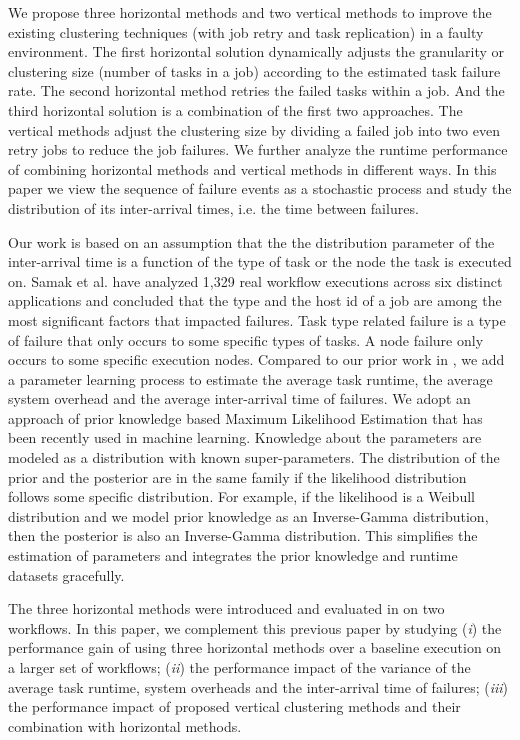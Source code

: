 \documentclass{IOS-Book-Article}
\begin{document}
We propose three horizontal methods and two vertical methods to improve the existing clustering techniques (with job retry and task replication) in a faulty environment. The first horizontal solution dynamically adjusts the granularity or clustering size (number of tasks in a job) according to the estimated  task failure rate. The second horizontal method retries the failed tasks within a job. And the third horizontal solution is a combination of the first two approaches. The vertical methods adjust the clustering size by dividing a failed job into two even retry jobs to reduce the job failures. We further analyze the runtime performance of combining horizontal methods and vertical methods in different ways. 
In this paper we view the sequence of failure events as a stochastic process and study the distribution of its inter-arrival times, i.e. the time between failures. 

Our work is based on an assumption that the the distribution parameter of the inter-arrival time is a function of the type of task or the node the task is executed on. Samak \cite{Samak2011} et al. have analyzed 1,329 real workflow executions across six distinct applications and concluded that the type and the host id of a job are among the most significant factors that impacted failures. Task type related failure is a type of failure that only occurs to some specific types of tasks. A node failure only occurs to some specific execution nodes. Compared to our prior work in \cite{Chen2012}, we add a parameter learning process to estimate the average task runtime, the average system overhead and the average inter-arrival time of failures. We adopt an approach of prior knowledge based Maximum Likelihood Estimation that has been recently used in machine learning. Knowledge about the parameters are modeled as a distribution with known super-parameters. The distribution of the prior and the posterior are in the same family if the likelihood distribution follows some specific distribution. For example, if the likelihood is a Weibull distribution and we model prior knowledge as an Inverse-Gamma distribution, then the posterior is also an Inverse-Gamma distribution. This simplifies the estimation of parameters and integrates the prior knowledge and runtime datasets gracefully. 

The three horizontal methods were introduced and evaluated in \cite{Chen2012} on two workflows. In this paper, we complement this previous paper by studying (\emph{i}) the performance gain of using three horizontal methods over a baseline execution on a larger set of workflows; (\emph{ii}) the performance impact of the variance of the average task runtime, system overheads and the inter-arrival time of failures; (\emph{iii}) the performance impact of proposed vertical clustering methods and their combination with horizontal methods. 
\end{document}
